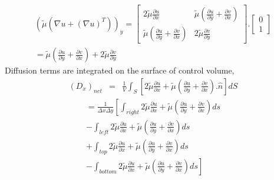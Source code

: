 \begin{eqnarray*}
 (\tilde\mu (\nabla  u + (\nabla  u)^T))_y = \begin{bmatrix} 2\tilde\mu\frac{\partial u}{\partial x} & \tilde\mu\left(\frac{\partial u}{\partial y}+\frac{\partial v}{\partial x}\right) \\ 
 \tilde\mu\left(\frac{\partial u}{\partial y}+\frac{\partial v}{\partial x}\right) & 2\tilde\mu\frac{\partial v}{\partial y}  \end{bmatrix}
 .\begin{bmatrix}0 \\1 \end{bmatrix} \\
 = \tilde\mu\left(\frac{\partial u}{\partial y}+\frac{\partial v}{\partial x}\right)+2\tilde\mu\frac{\partial v}{\partial y}
\end{eqnarray*}
 Diffusion terms are integrated on the surface of control volume, 
 \begin{eqnarray*}
  (D_x)_{net} &=& \frac{1}{V}\int_S \left[2\tilde\mu\frac{\partial u}{\partial x} + \tilde\mu\left(\frac{\partial u}{\partial y}+\frac{\partial v}{\partial x}\right).\hat n\right] dS
 \end{eqnarray*}
\begin{eqnarray}
= \frac{1}{\Delta x \Delta y}\left[\int_{right} 2\tilde\mu\frac{\partial u}{\partial x} + \tilde\mu\left(\frac{\partial u}{\partial y}+\frac{\partial v}{\partial x}\right) ds \right. \nonumber \\
- \int_{left} 2\tilde\mu\frac{\partial u}{\partial x} + \tilde\mu\left(\frac{\partial u}{\partial y}+\frac{\partial v}{\partial x}\right) ds \nonumber \\
+ \int_{top} 2\tilde\mu\frac{\partial u}{\partial x} + \tilde\mu\left(\frac{\partial u}{\partial y}+\frac{\partial v}{\partial x}\right) ds \nonumber \\
\left.-\int_{bottom} 2\tilde\mu\frac{\partial u}{\partial x} + \tilde\mu\left(\frac{\partial u}{\partial y}+\frac{\partial v}{\partial x}\right) ds \right]
\end{eqnarray}
